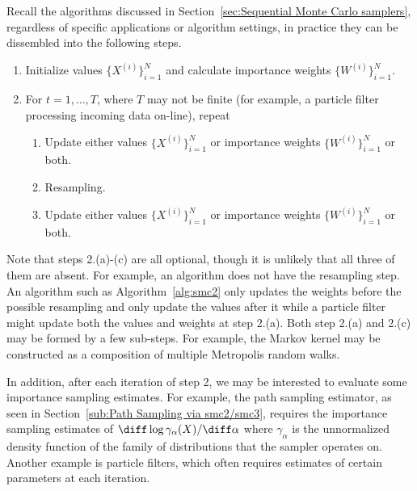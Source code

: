 Recall the \smc algorithms discussed in Section~\ref{sec:Sequential Monte Carlo samplers}, regardless of specific applications or algorithm settings, in practice they can be dissembled into the following steps.
\begin{enumerate}
  \item Initialize values $\{X^{(i)}\}_{i=1}^N$ and calculate importance weights $\{W^{(i)}\}_{i=1}^N$.
  \item For $t = 1,\dots,T$, where $T$ may not be finite (for example, a particle filter processing incoming data on-line), repeat
    \begin{enumerate}
      \item Update either values $\{X^{(i)}\}_{i=1}^N$ or importance weights $\{W^{(i)}\}_{i=1}^N$ or both.
      \item Resampling.
      \item Update either values $\{X^{(i)}\}_{i=1}^N$ or importance weights $\{W^{(i)}\}_{i=1}^N$ or both.
    \end{enumerate}
\end{enumerate}
Note that steps 2.(a)-(c) are all optional, though it is unlikely that all three of them are absent. For example, an \ais algorithm does not have the resampling step. An \smc algorithm such as Algorithm~\ref{alg:smc2} only updates the weights before the possible resampling and only update the values after it while a particle filter might update both the values and weights at step 2.(a). Both step 2.(a) and 2.(c) may be formed by a few sub-steps. For example, the Markov kernel may be constructed as a composition of multiple Metropolis random walks.

In addition, after each iteration of step 2, we may be interested to evaluate some importance sampling estimates. For example, the path sampling estimator, as seen in Section~\ref{sub:Path Sampling via smc2/smc3}, requires the importance sampling estimates of $\diff\log\gamma_{\alpha}(X)/\diff\alpha$ where $\gamma_{\alpha}$ is the unnormalized density function of the family of distributions that the \smc sampler operates on. Another example is particle filters, which often requires estimates of certain parameters at each iteration.

